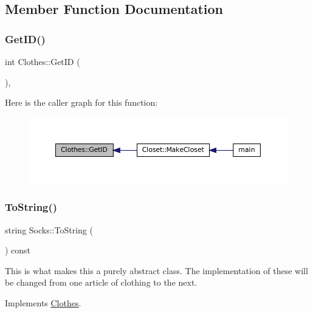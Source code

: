 \subsection{Member Function Documentation}
\mbox{\label{classClothes_a3f6dac172f333126d19010f85ec44e4c}} 
\subsubsection{\texorpdfstring{Get\+I\+D()}{GetID()}}
{\footnotesize\ttfamily int Clothes\+::\+Get\+ID (\begin{DoxyParamCaption}{ }\end{DoxyParamCaption})\hspace{0.3cm}{\ttfamily [inline]}, {\ttfamily [inherited]}}

Here is the caller graph for this function\+:\nopagebreak
\begin{figure}[H]
\begin{center}
\leavevmode
\includegraphics[width=350pt]{classClothes_a3f6dac172f333126d19010f85ec44e4c_icgraph}
\end{center}
\end{figure}
\mbox{\label{classSocks_aad237fbcc4ccf36a2956fcdef8760683}} 
\subsubsection{\texorpdfstring{To\+String()}{ToString()}}
{\footnotesize\ttfamily string Socks\+::\+To\+String (\begin{DoxyParamCaption}{ }\end{DoxyParamCaption}) const\hspace{0.3cm}{\ttfamily [virtual]}}

This is what makes this a purely abstract class. The implementation of these will be changed from one article of clothing to the next. 

Implements \mbox{\hyperlink{classClothes_a953d143394e9a2c007ab0c3a638973cf}{Clothes}}.



